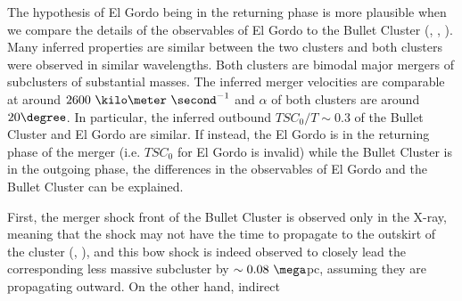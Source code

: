 The hypothesis of El Gordo being in the returning phase is more plausible when
we compare the details of the observables of El Gordo to the Bullet
Cluster (\citealt{Bradac2006b}, \citealt{Springel2007},
\citealt{Mastropietro2008a}).
Many inferred properties are similar between the two clusters and
both clusters were observed in similar wavelengths. Both clusters are
bimodal major mergers of subclusters of substantial masses. The inferred
merger velocities are comparable at around $2600~\kilo\meter~\second^{-1}$
and $\alpha$ of both clusters are around $20 \degree$. 
In particular, the inferred outbound $TSC_0 / T \sim 0.3$ of the Bullet Cluster and El Gordo
are similar. If instead, the El Gordo
is in the returning phase of the merger (i.e. $TSC_0$ for El Gordo is
invalid) while the Bullet Cluster is in the outgoing phase, the differences
in the observables of El Gordo and the Bullet Cluster can be explained.\par
First, the merger shock front of the Bullet Cluster is
observed only in the X-ray, meaning that the shock may not have the
time to propagate to the outskirt of the cluster (\citealt{Bruggen2011},
\citealt{Markevitch2007}), and this bow shock is indeed observed to closely
lead the corresponding less massive subcluster by $\sim 0.08~\mega$pc,
assuming they are propagating outward. On the other hand, indirect
